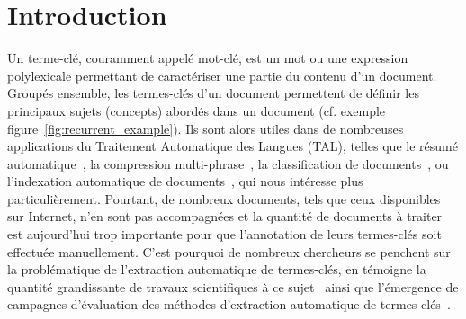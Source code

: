 \section{Introduction}
\label{sec:introduction}
  Un terme-clé, couramment appelé mot-clé, est un mot ou une expression
  polylexicale permettant de caractériser une partie du contenu d'un document.
  Groupés ensemble, les termes-clés d'un document permettent de définir les
  principaux sujets (concepts) abordés dans un document (cf. exemple
  figure~\ref{fig:recurrent_example}). Ils sont alors utiles dans de
  nombreuses applications du Traitement Automatique des Langues (TAL), telles
  que  le résumé automatique~\cite{avanzo2005keyphrase}, la compression
  multi-phrase~\cite{boudin2013multisentencecompression}, la classification de
  documents~\cite{han2007webdocumentclustering}, ou l'indexation automatique de
  documents~\cite{medelyan2008smalltrainingset}, qui nous intéresse plus
  particulièrement. Pourtant, de nombreux documents, tels que ceux disponibles
  sur Internet, n'en sont pas accompagnées et la quantité de documents à traiter
  est aujourd'hui trop importante pour que l'annotation de leurs termes-clés
  soit effectuée manuellement. C'est pourquoi de nombreux chercheurs se penchent
  sur la problématique de l'extraction automatique de termes-clés, en témoigne
  la quantité grandissante de travaux scientifiques à ce
  sujet~\cite{hasan2014state_of_the_art} ainsi que l'émergence de campagnes
  d'évaluation des méthodes d'extraction automatique de
  termes-clés~\cite{kim2010semeval,paroubek2012deft}.

